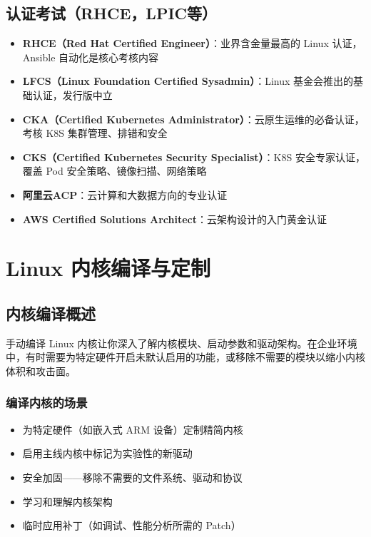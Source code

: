 \documentclass[12pt,UTF8]{ctexbook}
\begin{document}
\section{认证考试（RHCE，LPIC等）}
\begin{itemize}
    \item \textbf{RHCE（Red Hat Certified Engineer）}：业界含金量最高的 Linux 认证，Ansible 自动化是核心考核内容
    \item \textbf{LFCS（Linux Foundation Certified Sysadmin）}：Linux 基金会推出的基础认证，发行版中立
    \item \textbf{CKA（Certified Kubernetes Administrator）}：云原生运维的必备认证，考核 K8S 集群管理、排错和安全
    \item \textbf{CKS（Certified Kubernetes Security Specialist）}：K8S 安全专家认证，覆盖 Pod 安全策略、镜像扫描、网络策略
    \item \textbf{阿里云ACP}：云计算和大数据方向的专业认证
    \item \textbf{AWS Certified Solutions Architect}：云架构设计的入门黄金认证
\end{itemize}

\chapter{Linux 内核编译与定制}
\label{chap:kernel-build}

\section{内核编译概述}
\label{sec:kernel-intro}

手动编译 Linux 内核让你深入了解内核模块、启动参数和驱动架构。在企业环境中，有时需要为特定硬件开启未默认启用的功能，或移除不需要的模块以缩小内核体积和攻击面。

\subsection*{编译内核的场景}

\begin{itemize}
    \item 为特定硬件（如嵌入式 ARM 设备）定制精简内核
    \item 启用主线内核中标记为实验性的新驱动
    \item 安全加固——移除不需要的文件系统、驱动和协议
    \item 学习和理解内核架构
    \item 临时应用补丁（如调试、性能分析所需的 Patch）
\end{itemize}
\end{document}
